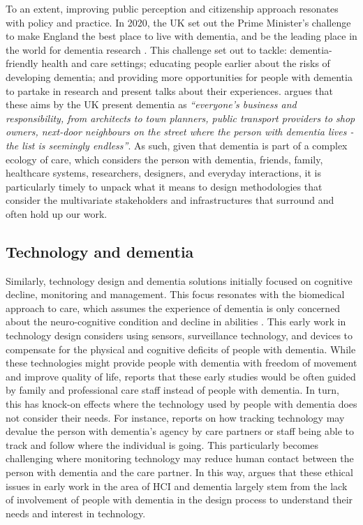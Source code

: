 To an extent, improving public perception and citizenship approach resonates with policy and practice. In 2020, the UK set out the Prime Minister’s challenge to make England the best place to live with dementia, and be the leading place in the world for dementia research \citep{budgett2021designing}. This challenge set out to tackle: dementia-friendly health and care settings; educating people earlier about the risks of developing dementia; and  providing more opportunities for people with dementia to partake in research and present talks about their experiences. \cite{keady2017social} argues that these aims by the UK present dementia as \textit{``everyone’s business and responsibility, from architects to town planners, public transport providers to shop owners, next-door neighbours on the street where the person with dementia lives - the list is seemingly endless''}. As such, given that dementia is part of a complex ecology of care, which considers the person with dementia, friends, family, healthcare systems, researchers, designers, and everyday interactions, it is particularly timely to unpack what it means to design methodologies that consider the multivariate stakeholders and infrastructures that surround and often hold up our work. 

\subsection{Technology and dementia}
\label{Context:Design}
Similarly, technology design and dementia solutions initially focused on cognitive decline, monitoring and management. This focus resonates with the biomedical approach to care, which assumes the experience of dementia is only concerned about the neuro-cognitive condition and decline in abilities \citep{o2022conceptualizing}. This early work in technology design considers using sensors, surveillance technology, and devices to compensate for the physical and cognitive deficits of people with dementia. While these technologies might provide people with dementia with freedom of movement and improve quality of life, \cite{bharucha2009intelligent} reports that these early studies would be often guided by family and professional care staff instead of people with dementia. In turn, this has knock-on effects where the technology used by people with dementia does not consider their needs. For instance, \cite{astell2006technology} reports on how tracking technology may devalue the person with dementia's agency by care partners or staff being able to track and follow where the individual is going. This particularly becomes challenging where monitoring technology may reduce human contact between the person with dementia and the care partner. In this way, \cite{astell2006technology} argues that these ethical issues in early work in the area of HCI and dementia largely stem from the lack of involvement of people with dementia in the design process to understand their needs and interest in technology.

